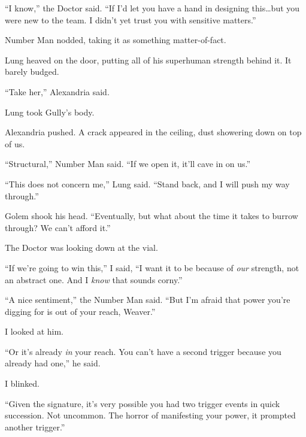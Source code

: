 ``I know,'' the Doctor said.  ``If I'd let you have a hand in designing this\ldots but you were new to the team.  I didn't yet trust you with sensitive matters.''



Number Man nodded, taking it as something matter-of-fact.



Lung heaved on the door, putting all of his superhuman strength behind it.  It barely budged.



``Take her,'' Alexandria said.



Lung took Gully's body.



Alexandria pushed.  A crack appeared in the ceiling, dust showering down on top of us.



``Structural,'' Number Man said.  ``If we open it, it'll cave in on us.''



``This does not concern me,'' Lung said.  ``Stand back, and I will push my way through.''



Golem shook his head.  ``Eventually, but what about the time it takes to burrow through?  We can't afford it.''



The Doctor was looking down at the vial.



``If we're going to win this,'' I said, ``I want it to be because of \emph{our} strength, not an abstract one.  And I \emph{know} that sounds corny.''



``A nice sentiment,'' the Number Man said.  ``But I'm afraid that power you're digging for is out of your reach, Weaver.''



I looked at him.



``Or it's already \emph{in} your reach.  You can't have a second trigger because you already had one,'' he said.



I blinked.



``Given the signature, it's very possible you had two trigger events in quick succession.  Not uncommon.  The horror of manifesting your power, it prompted another trigger.''



